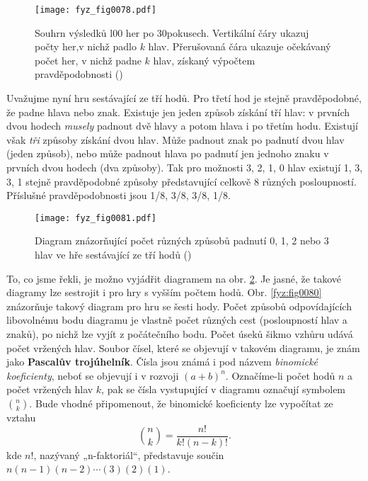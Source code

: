     \begin{figure}[ht!]  %
      \centering
      \texttt{[image: fyz\_fig0078.pdf]}
      \caption{Souhrn výsledků l00 her po 30pokusech. Vertikální čáry ukazuj počty her,v nichž 
              padlo \(k\) hlav. Přerušovaná čára ukazuje očekávaný počet her, v nichž padne \(k\) 
              hlav, získaný výpočtem pravděpodobnosti (\cite[s.~80]{Feynman01})}
      \label{fyz:fig0078}
    \end{figure}
    
    Uvažujme nyní hru sestávající ze tří hodů. Pro třetí hod je stejně pravděpodobné, že padne 
    hlava nebo znak. Existuje jen jeden způsob získání tří hlav: v prvních dvou hodech 
    \emph{musely} padnout dvě hlavy a potom hlava i po třetím hodu. Existují však \emph{tři} 
    způsoby získání dvou hlav. Může padnout znak po padnutí dvou hlav (jeden způsob), nebo může 
    padnout hlava po padnutí jen jednoho znaku v prvních dvou hodech (dva způsoby). Tak pro možnosti
    \num{3}, \num{2}, \num{1}, \num{0} hlav existují \num{1}, \num{3}, \num{3}, \num{1} stejně 
    pravděpodobné způsoby představující celkově \num{8} různých posloupností. Příslušné 
    pravděpodobnosti jsou \num{1/8}, \num{3/8}, \num{3/8}, \num{1/8}.

    \begin{figure}[ht!]  %
      \centering
      \texttt{[image: fyz\_fig0081.pdf]}
      \caption{Diagram znázorňující počet různých způsobů padnutí \num{0}, \num{1}, \num{2} nebo 
              \num{3} hlav ve hře sestávající ze tří hodů (\cite[s.~81]{Feynman01})}
      \label{fyz:fig0081}
    \end{figure}
    
    To, co jsme řekli, je možno vyjádřit diagramem na obr. \ref{fyz:fig0081}. Je jasné, že takové 
    diagramy lze sestrojit i pro hry s vyšším počtem hodů. Obr. \ref{fyz:fig0080} znázorňuje takový 
    diagram pro hru se šesti hody. Počet způsobů odpovídajících libovolnému bodu diagramu je 
    vlastně počet různých cest (posloupností hlav a znaků), po nichž lze vyjít z počátečního bodu. 
    Počet úseků šikmo vzhůru udává počet vržených hlav. Soubor čísel, které se objevují v takovém 
    diagramu, je znám jako \textbf{Pascalův trojúhelník}. Čísla jsou známá i pod názvem 
    \emph{binomické koeficienty}, neboť se objevují i v rozvoji \((a + b)^n\). Označíme-li počet 
    hodů \(n\) a počet vržených hlav \(k\), pak se čísla vystupující v diagramu označují symbolem  
    \(\binom{n}{k}\). Bude vhodné připomenout, že binomické koeficienty 
    lze vypočítat ze vztahu
    \begin{equation}\label{fyz:eq074}
      \binom{n}{k} = \frac{n!}{k!(n-k)!}.
    \end{equation}
    kde \(n!\), nazývaný „n-faktoriál“, představuje součin \(n(n- 1)(n-2)\cdots (3)(2)(1)\).
    
